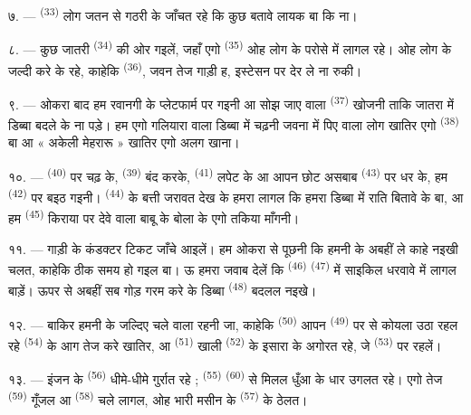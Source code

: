 ७. ---  \textsuperscript{(33)} लोग जतन से गठरी के
जाँचत रहे कि कुछ बतावे लायक बा कि ना।

८. --- कुछ जातरी  \textsuperscript{(34)} की ओर गइलें,
जहाँ एगो  \textsuperscript{(35)} ओह लोग के परोसे में लागल
रहे। ओह लोग के जल्दी करे के रहे, काहेकि 
\textsuperscript{(36)}, जवन तेज गाड़ी ह, इस्टेसन पर देर ले ना रुकी।

९. --- ओकरा बाद हम रवानगी के प्लेटफार्म पर गइनी आ सोझ जाए वाला
 \textsuperscript{(37)} खोजनी ताकि जातरा में डिब्बा बदले के
ना पड़े। हम एगो गलियारा वाला डिब्बा में चढ़नी जवना में पिए वाला लोग
खातिर एगो  \textsuperscript{(38)} बा आ « अकेली मेहरारू »
खातिर एगो अलग खाना।

\VUsaut{3.0mm}

१०. ---  \textsuperscript{(40)} पर चढ़ के, 
\textsuperscript{(39)} बंद करके,  \textsuperscript{(41)} लपेट
के आ आपन छोट असबाब  \textsuperscript{(43)} पर धर के, हम
 \textsuperscript{(42)} पर बइठ गइनी। 
\textsuperscript{(44)} के बत्ती जरावत देख के हमरा लागल कि हमरा डिब्बा में
राति बितावे के बा, आ हम  \textsuperscript{(45)} किराया पर
देवे वाला बाबू के बोला के एगो तकिया माँगनी।

११. --- गाड़ी के कंडक्टर टिकट जाँचे आइलें। हम ओकरा से पूछनी कि हमनी के
अबहीं ले काहे नइखी चलत, काहेकि ठीक समय हो गइल बा। ऊ हमरा जवाब देलें कि
 \textsuperscript{(46)} 
\textsuperscript{(47)} में साइकिल धरवावे में लागल बाड़ें। ऊपर से अबहीं
सब गोड़ गरम करे के डिब्बा \textsuperscript{(48)} बदलल नइखे।

१२. --- बाकिर हमनी के जल्दिए चले वाला रहनी जा, काहेकि 
\textsuperscript{(50)} आपन  \textsuperscript{(49)} पर से
कोयला उठा रहल रहे  \textsuperscript{(54)} के आग तेज करे
खातिर, आ  \textsuperscript{(51)} खाली  \textsuperscript{(52)} के इसारा के अगोरत रहे, जे
 \textsuperscript{(53)} पर रहलें।

१३. --- इंजन के  \textsuperscript{(56)} धीमे-धीमे गुर्रात
रहे ;  \textsuperscript{(55)}  \textsuperscript{(60)}
से मिलल धुँआ के धार उगलत रहे। एगो तेज  \textsuperscript{(59)}
गूँजल आ  \textsuperscript{(58)} चले लागल, ओह भारी मसीन के
 \textsuperscript{(57)} के ठेलत।

